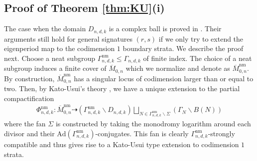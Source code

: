 \documentclass[12pt, letterpaper]{amsart}
\theoremstyle{plain}
\theoremstyle{definition}
\begin{document}
\subsection{Proof of Theorem
\ref{thm:KU}(i)}\label{sec:ProofThm1.1.ii}

The case when the domain $D_{n,d,k}$ is a complex ball is proved in \cite[Sec. 3.3]{gallardo2021geometric}. 
Their arguments still hold for general signatures $(r,s)$ if we only try to extend the eigenperiod map to the codimension $1$ boundary strata. We describe the proof next.  Choose a neat subgroup $\Gamma^{\mathrm{nm}}_{n,d,k}\leq \Gamma_{n,d,k}$ of finite index. The choice of a neat subgroup induces a finite cover of  
$\overline{M}_{0,n}$ which we normalize and denote as 
$\overline{M}^{\mathrm{nm}}_{0,n}$.  
By construction, $\overline{M}^{\mathrm{nm}}_{0,n}$ has a singular locus of codimension larger than or equal to two. Then, by Kato-Usui's theory \cite[Thm. B]{KU08}, we have a unique extension  to the partial compactification
\begin{align*}
 \Phi_{n,d,k}^{ \mathrm{nm} }:
 \overline{M}^{\mathrm{nm}}_{0,n}
 \dashrightarrow
 \left( \Gamma^{\mathrm{nm}}_{n,d,k}\backslash D_{n,d,k} \right)
  \bigsqcup_{ N\in \Gamma^{\mathrm{nm}}_{n,d,k} \backslash \Sigma}(\Gamma_N\backslash B(N))
\end{align*}
 where the fan $\Sigma$ is constructed by taking the monodromy logarithm around each divisor and their $\mathrm{Ad}(\Gamma^{\mathrm{nm}}_{n,d,k})$-conjugates. This fan is clearly $\Gamma^{\mathrm{nm}}_{n,d,k}$-strongly compatible and thus gives rise to a Kato-Usui type extension to codimension $1$ strata.
\end{document}
